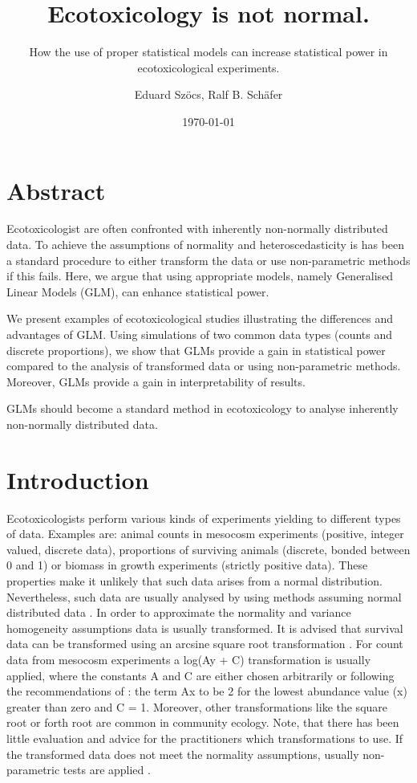 \documentclass{scrartcl}
\title{Ecotoxicology is not normal.}
\subtitle{How the use of proper statistical models can increase statistical power in ecotoxicological experiments.}
\author{Eduard Szöcs, Ralf B. Schäfer}
\date{\today}
\begin{document}
\maketitle

\section*{Abstract}
Ecotoxicologist are often confronted with inherently non-normally distributed data.
To achieve the assumptions of normality and heteroscedasticity is has been a standard procedure to either transform the data or use non-parametric methods if this fails.
Here, we argue that using appropriate models, namely Generalised Linear Models (GLM), can enhance statistical power.

We present examples of ecotoxicological studies illustrating the differences and advantages of GLM.
Using simulations of two common data types (counts and discrete proportions), we show that GLMs provide a gain in statistical power compared to the analysis of transformed data or using non-parametric methods.
Moreover, GLMs provide a gain in interpretability of results.

GLMs should become a standard method in ecotoxicology to analyse inherently non-normally distributed data.




\newpage
\section{Introduction}


Ecotoxicologists perform various kinds of experiments yielding to different types of data.
Examples are: animal counts in mesocosm experiments (positive, integer valued, discrete data), proportions of surviving animals (discrete, bonded between 0 and 1) or biomass in growth experiments (strictly positive data).
These properties make it unlikely that such data arises from a normal distribution. 
Nevertheless, such data are usually analysed by using methods assuming normal distributed data \citep{wang_making_2011}. 
In order to approximate the normality and variance homogeneity assumptions data is usually transformed.
It is advised that survival data can be transformed using an arcsine square root transformation \citep{oecd_current_2006, newman_quantitative_2012}. 
For count data from mesocosm experiments a log(Ay + C) transformation is usually applied, where the constants A and C are either chosen arbitrarily or following the recommendations of \citet{van_den_brink_impact_2000}: the term Ax to be 2 for the lowest abundance value (x) greater than zero and C = 1. 
Moreover, other transformations like the square root or forth root are common in community ecology.
Note, that there has been little evaluation and advice for the practitioners which transformations to use.
If the transformed data does not meet the normality assumptions, usually non-parametric tests are applied \citep{wang_making_2011}.
\end{document}
